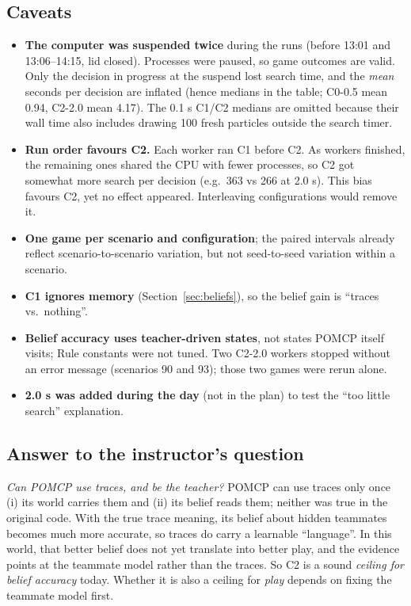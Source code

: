 \documentclass[11pt,a4paper]{article}
\theoremstyle{remark}
\begin{document}
\subsection{Caveats}
\begin{itemize}[nosep]
  \item \textbf{The computer was suspended twice} during the runs (before 13:01 and 13:06--14:15, lid closed). Processes
        were paused, so game outcomes are valid. Only the decision in progress at the suspend lost search time, and the
        \emph{mean} seconds per decision are inflated (hence medians in the table; C0-0.5 mean 0.94, C2-2.0 mean 4.17).
        The 0.1 s C1/C2 medians are omitted because their wall time also includes drawing 100 fresh particles outside the
        search timer.
  \item \textbf{Run order favours C2.} Each worker ran C1 before C2. As workers finished, the remaining ones shared the
        CPU with fewer processes, so C2 got somewhat more search per decision (e.g.\ 363 vs 266 at 2.0 s). This bias
        favours C2, yet no effect appeared. Interleaving configurations would remove it.
  \item \textbf{One game per scenario and configuration}; the paired intervals already reflect scenario-to-scenario
        variation, but not seed-to-seed variation within a scenario.
  \item \textbf{C1 ignores memory} (Section~\ref{sec:beliefs}), so the belief gain is ``traces vs.\ nothing''.
  \item \textbf{Belief accuracy uses teacher-driven states}, not states POMCP itself visits; Rule constants were not
        tuned. Two C2-2.0 workers stopped without an error message (scenarios 90 and 93); those two games were rerun alone.
  \item \textbf{2.0 s was added during the day} (not in the plan) to test the ``too little search'' explanation.
\end{itemize}

\subsection{Answer to the instructor's question}

\emph{Can POMCP use traces, and be the teacher?} POMCP can use traces only once (i) its world carries them and (ii) its
belief reads them; neither was true in the original code. With the true trace meaning, its belief about hidden teammates
becomes much more accurate, so traces do carry a learnable ``language''. In this world, that better belief does not yet
translate into better play, and the evidence points at the teammate model rather than the traces. So C2 is a sound
\emph{ceiling for belief accuracy} today. Whether it is also a ceiling for \emph{play} depends on fixing the teammate model
first.
\end{document}
